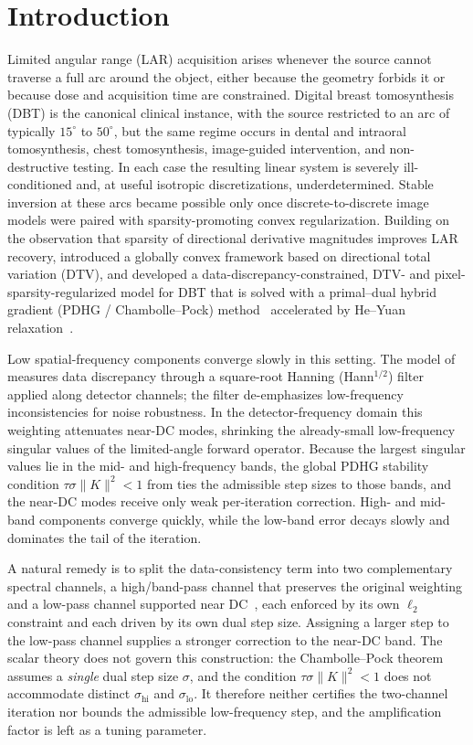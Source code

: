 \documentclass{article}
\begin{document}
\section{Introduction}

Limited angular range (LAR) acquisition arises whenever the source cannot traverse a full arc around the object, either because the geometry forbids it or because dose and acquisition time are constrained. Digital breast tomosynthesis (DBT) is the canonical clinical instance, with the source restricted to an arc of typically $15^\circ$ to $50^\circ$, but the same regime occurs in dental and intraoral tomosynthesis, chest tomosynthesis, image-guided intervention, and non-destructive testing. In each case the resulting linear system is severely ill-conditioned and, at useful isotropic discretizations, underdetermined. Stable inversion at these arcs became possible only once discrete-to-discrete image models were paired with sparsity-promoting convex regularization. Building on the observation that sparsity of directional derivative magnitudes improves LAR recovery, \citet{zhang2021directional} introduced a globally convex framework based on directional total variation (DTV), and \citet{sidky2025accurate} developed a data-discrepancy-constrained, DTV- and pixel-sparsity-regularized model for DBT that is solved with a primal--dual hybrid gradient (PDHG / Chambolle--Pock) method~\citep{chambolle2011first} accelerated by He--Yuan relaxation~\citep{he2012convergence}.

Low spatial-frequency components converge slowly in this setting. The model of \citet{sidky2025accurate} measures data discrepancy through a square-root Hanning (Hann$^{1/2}$) filter applied along detector channels; the filter de-emphasizes low-frequency inconsistencies for noise robustness. In the detector-frequency domain this weighting attenuates near-DC modes, shrinking the already-small low-frequency singular values of the limited-angle forward operator. Because the largest singular values lie in the mid- and high-frequency bands, the global PDHG stability condition $\tau\sigma\|K\|^2<1$ from \cite{chambolle2011first} ties the admissible step sizes to those bands, and the near-DC modes receive only weak per-iteration correction. High- and mid-band components converge quickly, while the low-band error decays slowly and dominates the tail of the iteration.

A natural remedy is to split the data-consistency term into two complementary spectral channels, a high/band-pass channel that preserves the original weighting and a low-pass channel supported near DC~\citep{iyadomi2026accelerating}, each enforced by its own $\ell_2$ constraint and each driven by its own dual step size. Assigning a larger step to the low-pass channel supplies a stronger correction to the near-DC band. The scalar theory does not govern this construction: the Chambolle--Pock theorem assumes a \emph{single} dual step size $\sigma$, and the condition $\tau\sigma\|K\|^2<1$ does not accommodate distinct $\sigma_{\mathrm{hi}}$ and $\sigma_{\mathrm{lo}}$. It therefore neither certifies the two-channel iteration nor bounds the admissible low-frequency step, and the amplification factor is left as a tuning parameter.
\end{document}
